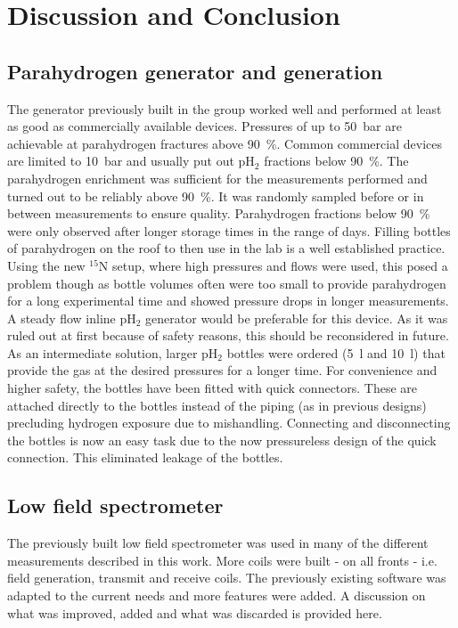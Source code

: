 \chapter{Discussion and Conclusion}
    \label{chap:conclusion}
    \section{Parahydrogen generator and generation}
    The generator previously built in the group worked well and performed at least as good as commercially available devices\cite{noauthor_parahydrogen_nodate-1}. Pressures of up to \SI{50}{\bar} are achievable at parahydrogen fractures above \SI{90}{\%}. Common commercial devices are limited to \SI{10}{\bar} and usually put out pH$_2$ fractions below \SI{90}{\%}. The parahydrogen enrichment was sufficient for the measurements performed and turned out to be reliably above \SI{90}{\%}. It was randomly sampled before or in between measurements to ensure quality. Parahydrogen fractions below \SI{90}{\percent} were only observed after longer storage times in the range of days.
        Filling bottles of parahydrogen on the roof to then use in the lab is a well established practice. Using the new $^{15}$N setup, where high pressures and flows were used, this posed a problem though as bottle volumes often were too small to provide parahydrogen for a long experimental time and showed pressure drops in longer measurements. A steady flow inline pH$_2$ generator would be preferable for this device. As it was ruled out at first because of safety reasons, this should be reconsidered in future. As an intermediate solution, larger pH$_2$ bottles were ordered (\SI{5}{\l} and \SI{10}{\l}) that provide the gas at the desired pressures for a longer time. For convenience and higher safety, the bottles have been fitted with quick connectors. These are attached directly to the bottles instead of the piping (as in previous designs) precluding hydrogen exposure due to mishandling. Connecting and disconnecting the bottles is now an easy task due to the now pressureless design of the quick connection. This eliminated leakage of the bottles.
    \section{Low field spectrometer}
        The previously built low field spectrometer was used in many of the different measurements described in this work. More coils were built - on all fronts - i.e. field generation, transmit and receive coils. The previously existing software was adapted to the current needs and more features were added. A discussion on what was improved, added and  what was discarded is provided here.

